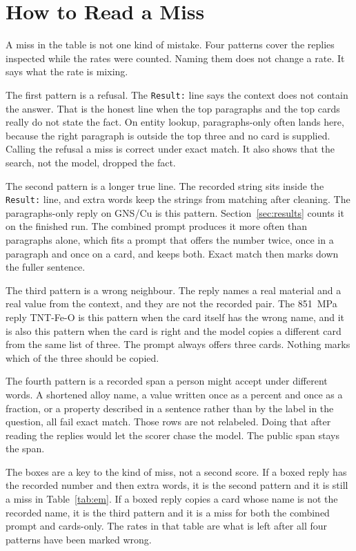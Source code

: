 \documentclass[conference]{IEEEtran}
\begin{document}
\section{How to Read a Miss}
A miss in the table is not one kind of mistake. Four patterns cover the replies inspected while the rates were counted. Naming them does not change a rate. It says what the rate is mixing.

The first pattern is a refusal. The \texttt{Result:} line says the context does not contain the answer. That is the honest line when the top paragraphs and the top cards really do not state the fact. On entity lookup, paragraphs-only often lands here, because the right paragraph is outside the top three and no card is supplied. Calling the refusal a miss is correct under exact match. It also shows that the search, not the model, dropped the fact.

The second pattern is a longer true line. The recorded string sits inside the \texttt{Result:} line, and extra words keep the strings from matching after cleaning. The paragraphs-only reply on GNS/Cu is this pattern. Section~\ref{sec:results} counts it on the finished run. The combined prompt produces it more often than paragraphs alone, which fits a prompt that offers the number twice, once in a paragraph and once on a card, and keeps both. Exact match then marks down the fuller sentence.

The third pattern is a wrong neighbour. The reply names a real material and a real value from the context, and they are not the recorded pair. The 851~MPa reply TNT-Fe-O is this pattern when the card itself has the wrong name, and it is also this pattern when the card is right and the model copies a different card from the same list of three. The prompt always offers three cards. Nothing marks which of the three should be copied.

The fourth pattern is a recorded span a person might accept under different words. A shortened alloy name, a value written once as a percent and once as a fraction, or a property described in a sentence rather than by the label in the question, all fail exact match. Those rows are not relabeled. Doing that after reading the replies would let the scorer chase the model. The public span stays the span.

The boxes are a key to the kind of miss, not a second score. If a boxed reply has the recorded number and then extra words, it is the second pattern and it is still a miss in Table~\ref{tab:em}. If a boxed reply copies a card whose name is not the recorded name, it is the third pattern and it is a miss for both the combined prompt and cards-only. The rates in that table are what is left after all four patterns have been marked wrong.
\end{document}
